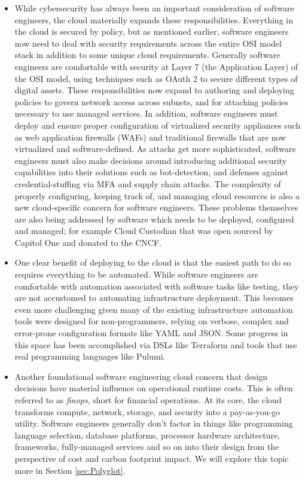 \documentclass[conference]{IEEEtran}
\begin{document}
\begin{itemize}
	\item  While cybersecurity has always been an important consideration of software engineers, the cloud materially expands these responsibilities. Everything in the cloud is secured by policy, but as mentioned earlier, software engineers now need to deal with security requirements across the entire OSI model\cite{OSIModel} stack in addition to some unique cloud requirements. Generally software engineers are comfortable with security at Layer 7 (the Application Layer) of the OSI model, using techniques such as OAuth 2\cite{oAuthStandard} to secure different types of digital assets. These responsibilities now expand to authoring and deploying policies to govern network access across subnets, and for attaching policies necessary to use managed services.  In addition, software engineers must deploy and ensure proper configuration of virtualized security appliances such as web application firewalls (WAFs) and traditional firewalls that are now virtualized and software-defined. As attacks get more sophisticated, software engineers must also make decisions around introducing additional security capabilities into their solutions such as bot-detection, and defenses against credential-stuffing via MFA and supply chain attacks.  The complexity of properly configuring, keeping track of, and managing cloud resources is also a new cloud-specific concern for software engineers.  These problems themselves are also being addressed by software which needs to be deployed, configured and managed; for example Cloud Custodian\cite{CloudCustodian} that was open sourced by Capitol One and donated to the CNCF. 
	
	\item  One clear benefit of deploying to the cloud is that the easiest path to do so requires everything to be automated. While software engineers are comfortable with automation associated with software tasks like testing, they are not accustomed to automating infrastructure deployment. This becomes even more challenging given many of the existing infrastructure automation tools were designed for non-programmers, relying on verbose, complex and error-prone configuration formats like YAML and JSON. Some progress in this space has been accomplished via DSLs like Terraform\cite{terraform} and tools that use real programming languages like Pulumi\cite{Pulumi}. 
	
	\item  Another foundational software engineering cloud concern that design decisions have material influence on operational runtime costs. This is often referred to as \textit{finops}, short for financial operations. At its core, the cloud transforms compute, network, storage, and security into a pay-as-you-go utility.  Software engineers generally don't factor in things like programming language selection, database platforms, processor hardware architecture, frameworks, fully-managed services and so on into their design from the perspective of cost and carbon footprint impact.  We will explore this topic more in Section \ref{sec:Polyglot}.
	
\end{itemize}
\end{document}
